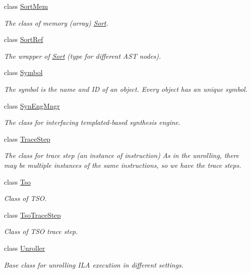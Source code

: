 \begin{DoxyCompactItemize}
class \mbox{\hyperlink{classilang_1_1_sort_mem}{Sort\+Mem}}
\begin{DoxyCompactList}\small\item\em The class of memory (array) \mbox{\hyperlink{classilang_1_1_sort}{Sort}}. \end{DoxyCompactList}\item 
class \mbox{\hyperlink{classilang_1_1_sort_ref}{Sort\+Ref}}
\begin{DoxyCompactList}\small\item\em The wrapper of \mbox{\hyperlink{classilang_1_1_sort}{Sort}} (type for different A\+ST nodes). \end{DoxyCompactList}\item 
class \mbox{\hyperlink{classilang_1_1_symbol}{Symbol}}
\begin{DoxyCompactList}\small\item\em The symbol is the name and ID of an object. Every object has an unique symbol. \end{DoxyCompactList}\item 
class \mbox{\hyperlink{classilang_1_1_syn_eng_mngr}{Syn\+Eng\+Mngr}}
\begin{DoxyCompactList}\small\item\em The class for interfacing templated-\/based synthesis engine. \end{DoxyCompactList}\item 
class \mbox{\hyperlink{classilang_1_1_trace_step}{Trace\+Step}}
\begin{DoxyCompactList}\small\item\em The class for trace step (an instance of instruction) As in the unrolling, there may be multiple instances of the same instructions, so we have the trace steps. \end{DoxyCompactList}\item 
class \mbox{\hyperlink{classilang_1_1_tso}{Tso}}
\begin{DoxyCompactList}\small\item\em Class of T\+SO. \end{DoxyCompactList}\item 
class \mbox{\hyperlink{classilang_1_1_tso_trace_step}{Tso\+Trace\+Step}}
\begin{DoxyCompactList}\small\item\em Class of T\+SO trace step. \end{DoxyCompactList}\item 
class \mbox{\hyperlink{classilang_1_1_unroller}{Unroller}}
\begin{DoxyCompactList}\small\item\em Base class for unrolling I\+LA execution in different settings. \end{DoxyCompactList}\item 

\end{DoxyCompactItemize}
